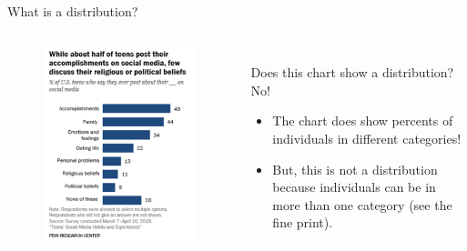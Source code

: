 \documentclass[aspectratio=169]{../latex_main/tntbeamer}  %
\begin{document}
	
	\begin{frame}{What is a distribution?}
	    \vspace{-1em}
	    \begin{columns}
	    
	        \begin{column}{.4\textwidth}
	              \begin{figure}
	                  \includegraphics[scale=.45]{Bild19}
	               \end{figure} 
	               
	        \end{column}
	        
	        \begin{column}{.6\textwidth}
	           
	              \\Does this chart show a distribution?\\
	              \bigskip
                    \pause
	              No!
	              \begin{itemize}
	                  \item The chart does show percents of individuals in different categories!
	                  \item But, this is not a distribution because individuals can be in more than one category (see the fine print).
	              \end{itemize}
	              
	        \end{column}
	        
	    \end{columns}
	\end{frame}
	
\end{document}
